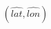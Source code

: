 \documentclass[preview]{standalone}
\begin{document}
\begin{align*}
(\hat{lat}, \hat{lon})
\end{align*}
\end{document}

